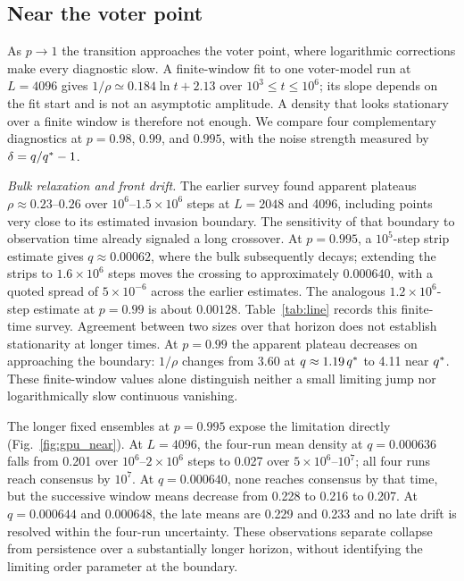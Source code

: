\subsection{Near the voter point}
\label{sec:svoter}

As $p\to 1$ the transition approaches the voter point, where logarithmic corrections make every
diagnostic slow. A finite-window fit to one voter-model run at $L=4096$
gives $1/\rho\simeq0.184\ln t+2.13$ over $10^3\le t\le10^6$;
its slope depends on the fit start and is not an asymptotic amplitude.
A density that looks stationary over a finite window is therefore not enough.
We compare four complementary diagnostics at $p = 0.98$,
$0.99$, and $0.995$, with the noise strength measured by $\delta = q/q^{*} - 1$.

\textit{Bulk relaxation and front drift.} The earlier survey found apparent
plateaus $\rho\approx0.23$--$0.26$ over $10^6$--$1.5\times10^6$ steps at
$L=2048$ and 4096, including points very close to its estimated invasion
boundary. The sensitivity of that boundary to observation time already
signaled a long crossover. At $p=0.995$, a $10^5$-step strip estimate gives
$q\approx0.00062$, where the bulk subsequently decays; extending the strips
to $1.6\times10^6$ steps moves the crossing to approximately $0.000640$,
with a quoted spread of $5\times10^{-6}$ across the earlier estimates.
The analogous $1.2\times10^6$-step estimate at $p=0.99$ is about $0.00128$.
Table~\ref{tab:line} records this finite-time survey. Agreement between two
sizes over that horizon does not establish stationarity at longer times.
At $p=0.99$ the apparent plateau decreases on approaching the boundary:
$1/\rho$ changes from 3.60 at $q\approx1.19\,q^{*}$ to 4.11 near $q^{*}$.
These finite-window values alone distinguish neither a small limiting jump
nor logarithmically slow continuous vanishing.

The longer fixed ensembles at $p=0.995$ expose the limitation directly
(Fig.~\ref{fig:gpu_near}). At $L=4096$, the four-run mean density at
$q=0.000636$ falls from 0.201 over $10^6$--$2\times10^6$ steps to
0.027 over $5\times10^6$--$10^7$; all four runs reach consensus by
$10^7$. At $q=0.000640$, none reaches consensus by that time, but the
successive window means decrease from 0.228 to 0.216 to 0.207. At
$q=0.000644$ and 0.000648, the late means are 0.229 and 0.233 and no
late drift is resolved within the four-run uncertainty. These observations
separate collapse from persistence over a substantially longer horizon,
without identifying the limiting order parameter at the boundary.

